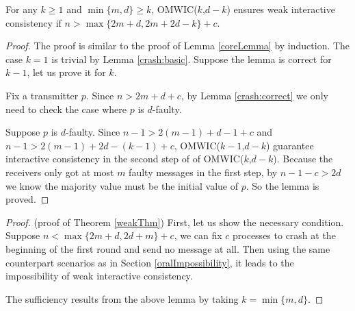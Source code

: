 \begin{lemma}
  For any $k \geqslant 1$ and $\min \{ m,d \}  \geqslant k $, OMWIC($k$,$d-k$)
  ensures weak interactive consistency if $n> \max \{ 2m+d,2m+2d-k \} +c$.
\end{lemma}

\begin{proof}
  The proof is similar to the proof of Lemma \ref{coreLemma} by induction. The case
  $k=1$ is trivial by Lemma \ref{crash:basic}. Suppose the lemma is correct for $k-1$,
  let us prove it for $k$.
  
  Fix a transmitter $p$. Since $n>2m+d+c$, by Lemma \ref{crash:correct} we only need to
  check the case where $p$ is $d$-faulty.
  
  Suppose $p$ is $d$-faulty. Since $n-1>2 ( m-1 ) +d-1+c$ and $n-1>2 ( m-1 )
  +2d- ( k-1 ) +c$, OMWIC($k-1$,$d-k$) guarantee interactive consistency in
  the second step of of OMWIC($k$,$d-k$). Because the receivers only got at
  most $m$ faulty messages in the first step, by $n-1-c>2d$ we know the
  majority value must be the initial value of $p$. So the lemma is proved.
\end{proof}

\begin{proof}
  (proof of Theorem \ref{weakThm}) First, let us show the necessary condition. Suppose $n<
  \max \{ 2m+d,2d+m \} +c$, we can fix $c$ processes to crash at the beginning
  of the first round and send no message at all. Then using the same
  counterpart scenarios as in Section \ref{oralImpossibility}, it leads to the impossibility
  of weak interactive consistency.
  
  The sufficiency results from the above lemma by taking $k= \min \{ m,d \}$.
\end{proof}
